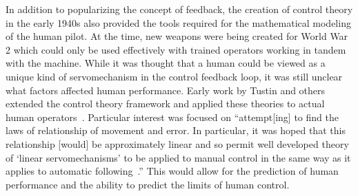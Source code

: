 In addition to popularizing the concept of feedback, the creation of control theory in the early 1940s also provided the tools required for the mathematical modeling of the human pilot.
At the time, new weapons were being created for World War 2 which could only be used effectively with trained operators working in tandem with the machine.
While it was thought that a human could be viewed as a unique kind of servomechanism in the control feedback loop, it was still unclear what factors affected human performance.
Early work by Tustin and others extended the control theory framework and applied these theories to actual human operators~\citep{tustin_investigation_nodate}.
Particular interest was focused on ``attempt[ing] to find the laws of relationship of movement and error. In particular, it was hoped that this relationship [would] be approximately linear and so permit well developed theory of `linear servomechanisms' to be applied to manual control in the same way as it applies to automatic following~\citep{tustin_investigation_nodate}.''
This would allow for the prediction of human performance and the ability to predict the limits of human control.

